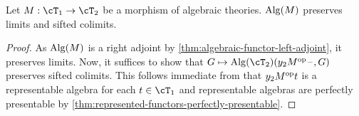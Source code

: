 \documentclass{zett}
\begin{document}
\begin{cor}
  Let $M : \cT_{1} \to \cT_{2}$ be a morphism of algebraic theories.
  $\operatorname{Alg}(M)$ preserves limits and sifted colimits.
\end{cor}
\begin{proof}
  As $\operatorname{Alg}(M)$ is a right adjoint by \cref{thm:algebraic-functor-left-adjoint}, it preserves limits.
  Now, it suffices to show that $G \mapsto \Alg(\cT_{2})(y_{2}M\op\blank, G)$ preserves sifted colimits.
  This follows immediate from that $y_{2}M^{\mathrm{op}} t$ is a representable algebra for each $t \in \cT_{1}$ and representable algebras are perfectly presentable by \cref{thm:represented-functors-perfectly-presentable}.
\end{proof}



\end{document}
